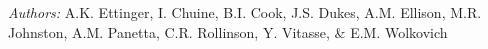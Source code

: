 \documentclass[12pt,a4paper]{letter}
\begin{document}
\begin{letter}{}
\newpage
{}\\
\\
\noindent \emph{Authors:} A.K. Ettinger, I. Chuine, B.I. Cook, J.S. Dukes, A.M. Ellison, M.R. Johnston, A.M. Panetta, C.R. Rollinson, Y. Vitasse, \& E.M. Wolkovich
\\


\end{letter}
\end{document}
